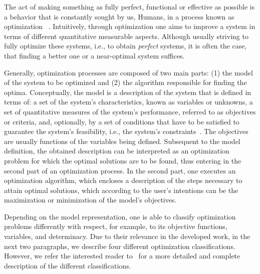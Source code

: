 \cleardoublepage
\label{chap:intro}

	The act of making something as fully perfect, functional or effective as possible is a behavior that is constantly sought by us, Humans, in a process known as optimization ~\cite{MerriamWebster2017OptimizationDefinition}. Intuitively, through optimization one aims to improve a system in terms of different quantitative measurable aspects. Although usually striving to fully optimize these systems, i.e., to obtain \textit{perfect} systems, it is often the case, that finding a better one or a near-optimal system suffices.

	Generally, optimization processes are composed of two main parts: (1) the model of the system to be optimized and (2) the algorithm responsible for finding the optima. Conceptually, the model is a description of the system that is defined in terms of: a set of the system's characteristics, known as variables or unknowns, a set of quantitative measures of the system's performance, referred to as objectives or criteria, and, optionally, by a set of conditions that have to be satisfied to guarantee the system's feasibility, i.e., the system's constraints~\cite{Nocedal2011NumericalOptimization}. The objectives are usually functions of the variables being defined. Subsequent to the model definition, the obtained description can be interpreted as an optimization problem for which the optimal solutions are to be found, thus entering in the second part of an optimization process. In the second part, one executes an optimization algorithm, which encloses a description of the steps necessary to attain optimal solutions, which according to the user's intentions can be the maximization or minimization of the model's objectives.

	Depending on the model representation, one is able to classify optimization problems differently with respect, for example, to its objective functions, variables, and determinacy. Due to their relevance in the developed work, in the next two paragraphs, we describe four different optimization classifications. However, we refer the interested reader to~\cite{Nocedal2011NumericalOptimization} for a more detailed and complete description of the different classifications.

